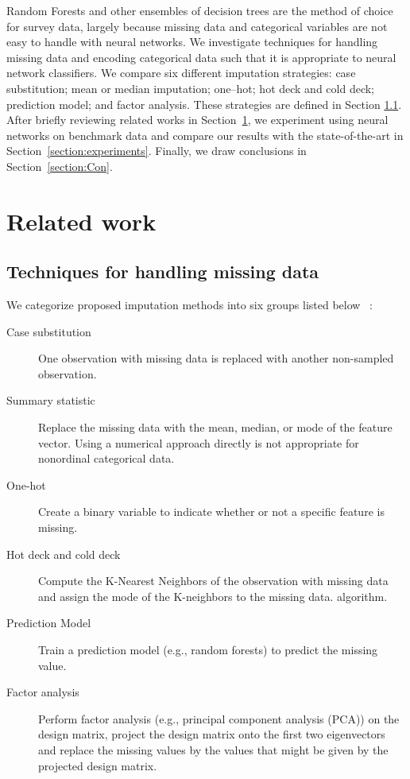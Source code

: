 \documentclass[10pt,twocolumn,letterpaper]{article}
\begin{document}
Random Forests and other ensembles of decision trees are the method of choice for survey data, largely because missing data and categorical variables are not easy to handle with neural networks. We investigate techniques for handling missing data and
encoding categorical data such that it is appropriate to neural network classifiers. We compare six different imputation strategies:  case substitution; mean or median imputation; one--hot; hot deck and cold deck; prediction model; and factor analysis. These strategies are defined in Section \ref{section:techniques}. \\

After briefly reviewing related works in Section~\ref{section:rw}, we experiment using neural networks on benchmark data and compare our results with the state-of-the-art in Section~\ref{section:experiments}. Finally, we draw conclusions in Section~\ref{section:Con}.

\section{Related work}  \label{section:rw}

\subsection{Techniques for handling missing data} \label{section:techniques}
We categorize proposed  imputation methods into six groups listed
below ~\cite{batista2003analysis}:

\begin{description}
\item[Case substitution] One observation with missing data is replaced with
another non-sampled observation.
\item[Summary statistic] Replace the missing data with the mean, median, or mode of
    the feature vector. Using a numerical approach directly is not appropriate for nonordinal categorical data.
\item[One-hot] Create a binary variable to indicate whether or not a specific
    feature is missing. %
\item[Hot deck and cold deck] Compute the K-Nearest Neighbors of the
    observation with missing data and assign the mode of the K-neighbors
    to the missing data. %
    algorithm.
\item[Prediction Model] Train a prediction model (e.g., random forests) to predict the missing value. %
\item[Factor analysis] Perform factor analysis (e.g., principal component analysis (PCA)) on the design
    matrix, project the design matrix onto the first two eigenvectors and
    replace the missing values by the values that might be given by the
    projected design matrix.
\end{description}
\end{document}
